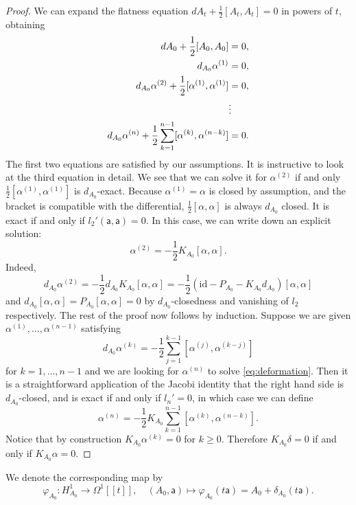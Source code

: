 \documentclass[11pt,a4paper]{amsart}
\theoremstyle{plain} %
\theoremstyle{definition}
\theoremstyle{remark}
\newcommand{\mr}{\mathrm}
\newcommand{\sfa}{\mathsf{a}}
\newcommand{\ra}{\rightarrow}
\begin{document}
\begin{proof}
We can expand the flatness equation $dA_t + \frac12[A_t,A_t] = 0$ in powers of $t$, obtaining  %
\begin{align}
dA_0 + \frac12[A_0,A_0] &= 0,  \\ 
d_{A_0} %
\alpha^{(1)} &= 0,  \\ 
d_{A_0}\alpha^{(2)} + \frac{1}{2}[\alpha^{(1)},\alpha^{(1)}] &= 0, \\ 
&\vdots \notag \\
d_{A_0}\alpha^{(n)} + \frac12\sum_{k=1}^{n-1}[\alpha^{(k)},\alpha^{(n-k)}] &= 0. \label{eq:deformation}
\end{align}
The first two equations are satisfied by our assumptions. It is instructive to look at the third equation in detail. We see that we can solve it for $\alpha^{(2)}$ if and only $\frac12[\alpha^{(1)},\alpha^{(1)}]$ is $d_{A_0}$-exact. Because $\alpha^{(1)} = \alpha$ is closed by assumption, and the bracket is compatible with the differential, $\frac12[\alpha,\alpha]$ is always $d_{A_0}$ closed. It is exact if and only if $l_2'(\sfa,\sfa) = 0$. %
In this case, we can write down an explicit solution: 
$$\alpha^{(2)} = -\frac{1}{2}K_{A_0}[\alpha,\alpha].$$
Indeed, 
$$d_{A_0}\alpha^{(2)} =-\frac12d_{A_0}K_{A_0}[\alpha,\alpha] = -\frac12(\mathrm{id} - P_{A_0} - K_{A_0}d_{A_0})[\alpha,\alpha]$$ 
and $d_{A_0}[\alpha,\alpha] = P_{A_0}[\alpha,\alpha] = 0$ by $d_{A_0}$-closedness and vanishing of $l_2$ respectively. The rest of the proof now follows by induction. Suppose we are given $\alpha^{(1)},\ldots,\alpha^{(n-1)}$ satisfying 
$$d_{A_0}\alpha^{(k)} = -\frac12\sum_{j=1}^{k-1}[\alpha^{(j)},\alpha^{(k-j)}] $$ 
for $k= 1,\ldots,n-1$ and we are looking for $\alpha^{(n)}$ to solve \eqref{eq:deformation}. Then it is a straightforward application of the Jacobi identity that the right hand side is $d_{A_0}$-closed, and is exact if and only if $l_{n}' = 0$, in which case we can define 
$$\alpha^{(n)} = -\frac12K_{A_0}\sum_{k=1}^{n-1}[\alpha^{(k)},\alpha^{(n-k)}].$$ 
Notice that by construction $K_{A_0}\alpha^{(k)} = 0$ for $k\geq 0$. Therefore $K_{A_0}\delta = 0$ if and only if $K_{A_0}\alpha = 0$.  
\end{proof}
We denote the corresponding map by %
\begin{equation}\label{phi - exp map on moduli space}
    \varphi_{A_0}\colon H^1_{A_0} \to \Omega^1[[t]],\quad (A_0,\sfa) \mapsto  \varphi_{A_0}(t\sfa)= A_0 +\delta_{A_0} (t\sfa) . 
\end{equation}
\end{document}
